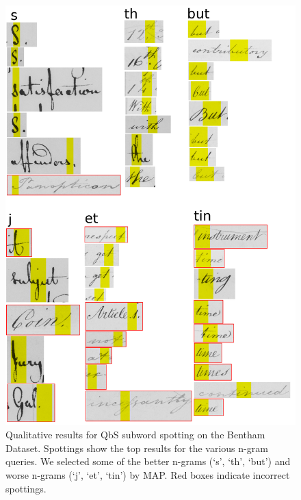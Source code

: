 \documentclass[ms,electronic,twosidetoc,letterpaper,chaptercenter,parttop,lof,lot]{byumsphd}
\begin{document}
\begin{figure}
    \centering
    \includegraphics[width=.75\textwidth]{qualSpot}
    \caption{Qualitative results for QbS subword spotting on the Bentham Dataset. Spottings show the top results for the various n-gram queries. We selected some of the better n-grams (`s', `th', `but') and worse n-grams (`j', `et', `tin') by MAP. Red boxes indicate incorrect spottings.
    }
    \label{fig:qualSpot}
\end{figure}
\end{document}
